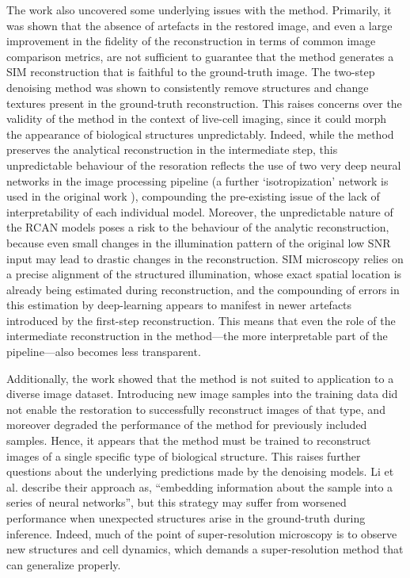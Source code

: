 \documentclass[12pt]{article}
\begin{document}
The work also uncovered some underlying issues with the method.
Primarily, it was shown that the absence of artefacts in the restored image,
and even a large improvement in the fidelity of the reconstruction in terms of common image comparison metrics,
are not sufficient to guarantee that the method generates a SIM reconstruction that is faithful to the ground-truth image.
The two-step denoising method was shown to consistently remove structures and change textures present in the ground-truth reconstruction.
This raises concerns over the validity of the method in the context of live-cell imaging,
since it could morph the appearance of biological structures unpredictably.
Indeed, while the method preserves the analytical reconstruction in the intermediate step,
this unpredictable behaviour of the resoration reflects the use of two very deep neural networks in the image processing pipeline
(a further `isotropization' network is used in the original work \cite{keypaper}),
compounding the pre-existing issue of the lack of interpretability of each individual model.
Moreover, the unpredictable nature of the RCAN models poses a risk to the behaviour of the analytic reconstruction,
because even small changes in the illumination pattern of the original low SNR input may lead to drastic changes in the reconstruction.
SIM microscopy relies on a precise alignment of the structured illumination,
whose exact spatial location is already being estimated during reconstruction,
and the compounding of errors in this estimation by deep-learning appears to manifest in newer artefacts introduced by the first-step reconstruction.
This means that even the role of the intermediate reconstruction in the method---the more interpretable part of the pipeline---also becomes less transparent.

Additionally, the work showed that the method is not suited to application to a diverse image dataset.
Introducing new image samples into the training data did not enable the restoration to successfully reconstruct images of that type,
and moreover degraded the performance of the method for previously included samples.
Hence, it appears that the method must be trained to reconstruct images of a single specific type of biological structure.
This raises further questions about the underlying predictions made by the denoising models.
Li et al. describe their approach as, ``embedding information about the sample into a series of neural networks''\cite{keypaper},
but this strategy may suffer from worsened performance when unexpected structures arise in the ground-truth during inference.
Indeed, much of the point of super-resolution microscopy is to observe new structures and cell dynamics,
which demands a super-resolution method that can generalize properly.
\end{document}
